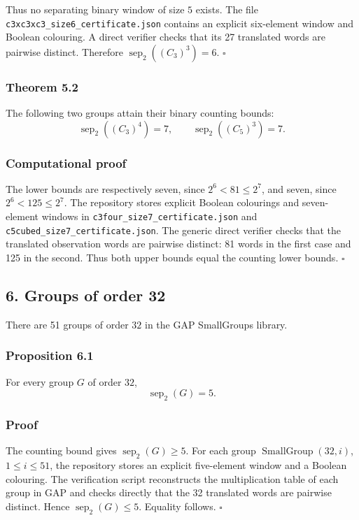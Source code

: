 \documentclass[
]{article}
\begin{document}
Thus no separating binary window of size \(5\) exists. The file \texttt{c3xc3xc3\_size6\_certificate.json} contains an explicit six-element window and Boolean colouring. A direct verifier checks that its 27 translated words are pairwise distinct. Therefore \(\operatorname{sep}_2((C_3)^3)=6\). \(\square\)

\subsubsection{Theorem 5.2}
The following two groups attain their binary counting bounds:
\[
\boxed{\operatorname{sep}_2((C_3)^4)=7},
\qquad
\boxed{\operatorname{sep}_2((C_5)^3)=7}.
\]

\subsubsection{Computational proof}
The lower bounds are respectively seven, since \(2^6<81\le2^7\), and seven,
since \(2^6<125\le2^7\). The repository stores explicit Boolean colourings and
seven-element windows in \texttt{c3four\_size7\_certificate.json} and
\texttt{c5cubed\_size7\_certificate.json}. The generic direct verifier checks
that the translated observation words are pairwise distinct: 81 words in the
first case and 125 in the second. Thus both upper bounds equal the counting
lower bounds. \(\square\)

\subsection{6. Groups of order 32}
There are 51 groups of order \(32\) in the GAP SmallGroups library.

\subsubsection{Proposition 6.1}
For every group \(G\) of order \(32\),
\[
\boxed{\operatorname{sep}_2(G)=5.}
\]
\subsubsection{Proof}
The counting bound gives \(\operatorname{sep}_2(G)\ge5\). For each group \(\operatorname{SmallGroup}(32,i)\), \(1\le i\le51\), the repository stores an explicit five-element window and a Boolean colouring. The verification script reconstructs the multiplication table of each group in GAP and checks directly that the 32 translated words are pairwise distinct. Hence \(\operatorname{sep}_2(G)\le5\). Equality follows. \(\square\)
\end{document}
